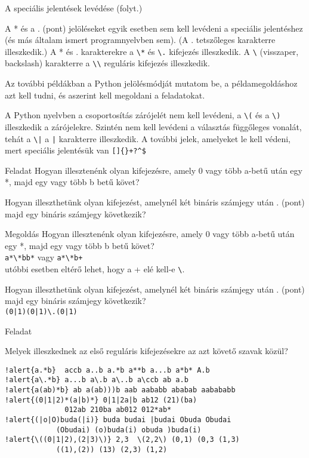 \documentclass[
    ignorenonframetext
    ]{beamer}
\begin{document}
\begin{frame}[fragile]
    {A speciális jelentések levédése (folyt.)}


    A * és a . (pont) jelöléseket egyik esetben sem kell levédeni a
    speciális jelentéshez (és más általam ismert programnyelvben sem).
    (A .  tetszőleges karakterre illeszkedik.)  A * és . karakterekre a
    \verb"\*" és \verb"\." kifejezés illeszkedik. A \verb"\" (visszaper,
    backslash) karakterre a \verb"\\" reguláris kifejezés illeszkedik.

    Az további példákban a Python jelölésmódját mutatom be, a
    példamegoldáshoz azt kell tudni, és aszerint kell megoldani a
    feladatokat.

    A Python nyelvben a csoportosítás zárójelét nem kell levédeni, a
    \verb"\(" és a \verb"\)" illeszkedik a zárójelekre. Szintén nem kell
    levédeni a választás függőleges vonalát, tehát a \verb"\|"
    a \verb"|" karakterre illeszkedik. A további jelek, amelyeket le
    kell védeni, mert speciális jelentésük van \verb"[]{}+?^$"
\end{frame}

\begin{frame}[fragile]
    {Feladat}
    Hogyan illesztenénk olyan kifejezésre, amely 0 vagy több a-betű után
    egy *, majd egy vagy több b betű követ?

    \vfill
    Hogyan illeszthetünk olyan kifejezést, amelynél két bináris számjegy
    után . (pont) majd egy bináris számjegy következik?

    \megoldasjon
\end{frame}

\begin{frame}[fragile]
    {Megoldás}
    Hogyan illesztenénk olyan kifejezésre, amely 0 vagy több a-betű után
    egy *, majd egy vagy több b betű követ?\\
    \verb!a*\*bb*! \quad vagy \quad \verb!a*\*b+!\\
    utóbbi esetben eltérő lehet, hogy a + elé kell-e \verb|\|.

    \vfill
    Hogyan illeszthetünk olyan kifejezést, amelynél két bináris számjegy
    után . (pont) majd egy bináris számjegy következik?\\
    \verb!(0|1)(0|1)\.(0|1)!
\end{frame}

\begin{frame}
    [fragile]{Feladat}

    Melyek illeszkednek az első reguláris kifejezésekre az azt követő
    szavak közül?

\begin{Verbatim}[commandchars=!\{\}]
!alert{a.*b}  accb a..b a.*b a**b a...b a*b* A.b
!alert{a\.*b} a...b a\.b a\..b a\ccb ab a.b
!alert{a(ab)*b} ab a(ab)))b aab aababb ababab aabababb
!alert{(0|1|2)*(a|b)*} 0|1|2a|b ab12 (21)(ba)
              012ab 210ba ab012 012*ab*
!alert{(|o|O)buda(|i)} buda budai |budai Obuda Obudai
            (Obudai) (o)buda(i) obuda )buda(i)
!alert{\((0|1|2),(2|3)\)} 2,3  \(2,2\) (0,1) (0,3 (1,3)
            ((1),(2)) (13) (2,3) (1,2)
\end{Verbatim}
\end{frame}
\end{document}
